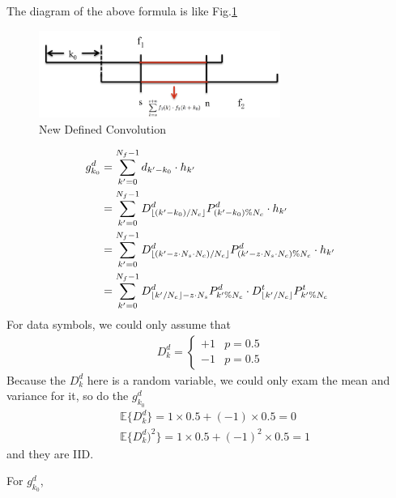 \documentclass[a4paper]{article}
\begin{document}
The diagram of the above formula is like Fig.\ref{fig:New Defined Convolution}
\begin{figure}[ht]
	\centering
	\includegraphics[width=3.1in]{figure/conv_figure.png}
	\caption{New Defined Convolution}
	\label{fig:New Defined Convolution}
\end{figure}
\begin{align}
	g^d_{k_0}
	&= \sum_{k' = 0}^{N_f-1} d_{k' - k_0} \cdot h_{k'}\\
	&= \sum_{k' = 0}^{N_f-1} D^d_{\lfloor(k' - k_0)/N_c\rfloor}P^d_{(k' - k_0)\%N_c} \cdot h_{k'}\\
	&= \sum_{k' = 0}^{N_f-1} D^d_{\lfloor(k' - z \cdot N_s \cdot N_c)/N_c\rfloor} P^d_{(k' - z \cdot N_s \cdot N_c)\%N_c}\cdot h_{k'}\\
	&= \sum_{k' = 0}^{N_f-1} D^d_{\lfloor k'/N_c\rfloor - z \cdot N_s} P^d_{k'\%N_c} \cdot D^t_{\lfloor k'/N_c\rfloor} P^t_{k' \% N_c}\\
\end{align}
For data symbols, we could only assume that 
\begin{align}
	D^d_k = 
	\begin{cases}
	+1 & p = 0.5\\
	-1 & p = 0.5	
	\end{cases}
\end{align}
Because the $D^d_k$ here is a random variable, we could only exam the mean and variance for it, so do the $g^d_{k_0}$
\begin{align}
	&\mathbb{E} \{D^d_k\} = 1 \times 0.5 + (-1) \times 0.5 = 0\\
	&\mathbb{E} \{D^d_k)^2\} = 1 \times 0.5 + (-1)^2 \times 0.5 = 1
\end{align}
and they are IID.

For $g^d_{k_0}$,
\end{document}
